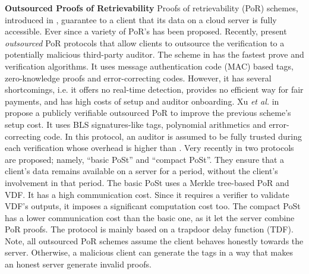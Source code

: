 


\noindent\textbf{Outsourced Proofs of Retrievability}
Proofs of retrievability (PoR) schemes, introduced in \cite{DBLP:conf/ccs/JuelsK07},  guarantee to a client that  its   data on a cloud server is fully accessible. Ever since  a variety of PoR's has been proposed.  Recently,  \cite{armknecht2014outsourced,xu2016lightweight} present  \emph{outsourced} PoR protocols that allow  clients to outsource the   verification to a potentially malicious third-party auditor. The scheme in \cite{armknecht2014outsourced}   has the fastest prove and verification algorithms. It uses message authentication code (MAC) based tags, zero-knowledge proofs and error-correcting codes. However, it  has  several shortcomings, i.e. it offers no real-time detection,  provides no efficient way for fair payments, and  has high costs of setup and auditor onboarding.   Xu \textit{et al.} in \cite{xu2016lightweight} propose a publicly verifiable outsourced PoR to improve the previous scheme's setup cost. It uses   BLS signatures-like tags, polynomial arithmetics and error-correcting code.  In this protocol, an auditor is assumed to be fully trusted during each verification whose overhead is higher  than \cite{armknecht2014outsourced}. Very recently in \cite{Storage-Time} two protocols are proposed; namely, ``basic PoSt'' and ``compact PoSt''. They ensure that a client's data remains available on a   server for a   period, without the client's involvement  in that period.  The basic PoSt  uses a Merkle tree-based PoR and VDF. It has a high communication cost. Since it  requires a verifier to validate VDF's outputs, it imposes a significant computation cost too. The compact PoSt has a lower communication cost than the basic one, as it let the server combine PoR proofs. The protocol is mainly based on a trapdoor delay function (TDF). Note,  all  outsourced PoR schemes \cite{armknecht2014outsourced,xu2016lightweight,Storage-Time}  assume the client behaves honestly towards the server. Otherwise, a malicious client can generate the tags in a way that  makes an honest server generate invalid proofs. 


